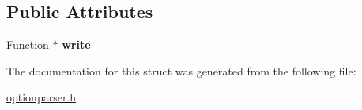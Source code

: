 \subsection*{Public Attributes}
\begin{DoxyCompactItemize}
\item 
Function $\ast$ {\bfseries write}\hypertarget{structoption_1_1PrintUsageImplementation_1_1FunctionWriter_a3442e05eb04d2b1ee321193f5b10557b}{}\label{structoption_1_1PrintUsageImplementation_1_1FunctionWriter_a3442e05eb04d2b1ee321193f5b10557b}

\end{DoxyCompactItemize}


The documentation for this struct was generated from the following file\+:\begin{DoxyCompactItemize}
\item 
\hyperlink{optionparser_8h}{optionparser.\+h}\end{DoxyCompactItemize}
